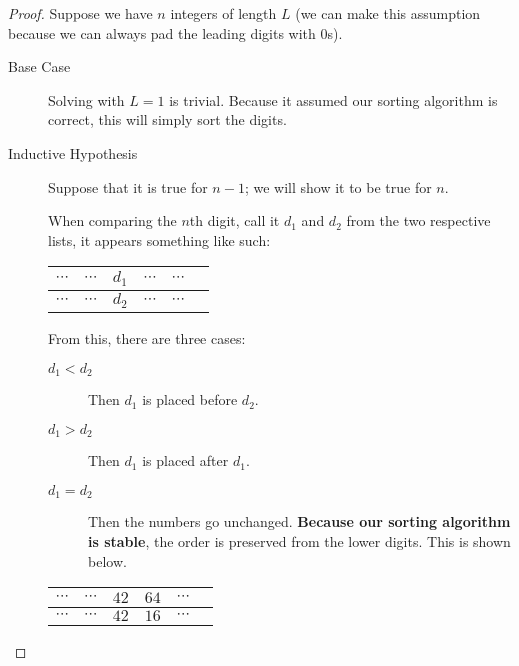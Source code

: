 \documentclass[12pt,listof=totoc,toc=sectionentrywithdots]{scrartcl}
\begin{document}
\problem{}
\begin{proof}
    Suppose we have $n$ integers of length $L$ (we can make this assumption because we can always pad the leading digits with \num{0}s).

    \begin{description}
        \item[Base Case] Solving with $L = 1$ is trivial. Because it assumed our sorting algorithm is correct, this will simply sort the digits.
        \item[Inductive Hypothesis] Suppose that it is true for $n - 1$; we will show it to be true for $n$.

            When comparing the $n$th digit, call it $d_1$ and $d_2$ from the two respective lists, it appears something like such:

            \begin{center}
                \begin{tabular}{|p{0.5cm}|p{0.5cm}|p{0.5cm}|p{0.5cm}|p{0.5cm}|p{0.5cm}|}
                    \hline
                    $\cdots$ & $\cdots$ & $d_1$ & $\cdots$ & $\cdots$ \\\hline
                    $\cdots$ & $\cdots$ & $d_2$ & $\cdots$ & $\cdots$ \\\hline
                \end{tabular}
            \end{center}

            From this, there are three cases:

            \begin{description}
                \item[$d_1 < d_2$] Then $d_1$ is placed before $d_2$.
                \item[$d_1 > d_2$] Then $d_1$ is placed after $d_1$.
                \item[$d_1 = d_2$] Then the numbers go unchanged. \textbf{Because our sorting algorithm is stable}, the order is preserved from the lower digits. This is shown below.
            \end{description}

            \begin{center}
                \begin{tabular}{|p{0.5cm}|p{0.5cm}|p{0.5cm}|p{0.5cm}|p{0.5cm}|p{0.5cm}|}
                    \hline
                    $\cdots$ & $\cdots$ & $42$ & $64$ & $\cdots$ \\\hline
                    $\cdots$ & $\cdots$ & $42$ & $16$ & $\cdots$ \\\hline
                \end{tabular}
            \end{center}


    \end{description}
\end{proof}
\end{document}

